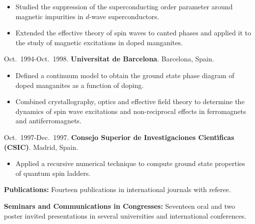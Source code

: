 \documentclass{article}
\begin{document}
\begin{itemize}\itemsep 0pt
\item Studied the suppression of the superconducting order parameter
around magnetic impurities in $d$-wave superconductors. 

\item Extended the effective theory of spin waves to canted phases
and applied it to the study of magnetic excitations in doped manganites.
\end{itemize}

Oct.~1994-Oct.~1998. {\bf Universitat de Barcelona}. Barcelona, Spain.

\begin{itemize}\itemsep 0pt
\item Defined a continuum model to obtain the ground state phase diagram 
of doped manganites as a function of doping.

\item Combined crystallography, optics and effective field theory to 
determine the dynamics of spin wave excitations and non-reciprocal 
effects in ferromagnets and antiferromagnets.
\end{itemize}

Oct.~1997-Dec.~1997. {\bf Consejo Superior de Investigaciones 
Cient\'{\i}ficas (CSIC)}. Madrid, Spain. 

\begin{itemize}\itemsep 0pt
\item Applied a recursive numerical technique to compute 
ground state properties of quantum spin ladders.
\end{itemize}



\medskip
{\bf Publications:}
%
Fourteen publications in international journals with referee.


\medskip
{\bf Seminars and Communications in Congresses:}
%
Seventeen oral and two poster invited presentations 
in several universities and international conferences.
\end{document}
